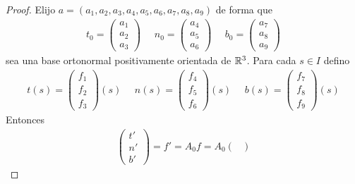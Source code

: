 \begin{teo}
\begin{proof}
        Elijo $a=(a_1, a_2, a_3, a_4, a_5, a_6, a_7, a_8, a_9)$ de forma que 
        \begin{gather*}
            t_0 = \begin{pmatrix}
                a_1 \\
                a_2\\
                a_3
            \end{pmatrix} \ \ \ \ \ \ 
            n_0 = \begin{pmatrix}
                a_4 \\
                a_5\\
                a_6
            \end{pmatrix} \ \ \ \ \ \ 
            b_0 = \begin{pmatrix}
                a_7 \\
                a_8\\
                a_9
            \end{pmatrix}
        \end{gather*}
        sea una base ortonormal positivamente orientada de $\mathbb{R}^3$. Para cada $s\in I$ defino 
        \begin{gather*}
            t(s) = \begin{pmatrix}
                f_1 \\
                f_2\\
                f_3
            \end{pmatrix}(s) \ \ \ \ \ \ 
            n(s) = \begin{pmatrix}
                f_4 \\
                f_5\\
                f_6
            \end{pmatrix}(s) \ \ \ \ \ \ 
            b(s) = \begin{pmatrix}
                f_7 \\
                f_8\\
                f_9
            \end{pmatrix}(s)
        \end{gather*}
        Entonces 
        \begin{gather*}
            \begin{pmatrix}
                t'\\
                n'\\
                b'
            \end{pmatrix} = f' = A_0f = A_0 \begin{pmatrix}

\end{pmatrix}
\end{gather*}
\end{proof}
\end{teo}
